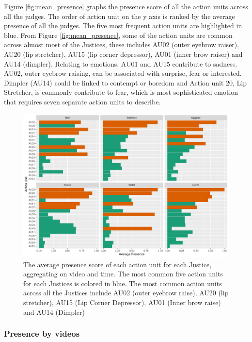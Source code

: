 \documentclass{monashthesis}
\begin{document}
\noindent Figure \ref{fig:mean_presence} graphs the presence score of all the action units across all the judges. The order of action unit on the y axis is ranked by the average presence of all the judges. The five most frequent action units are highlighted in blue. From Figure \ref{fig:mean_presence}, some of the action units are common across almost most of the Justices, these includes AU02 (outer eyebrow raiser), AU20 (lip stretcher), AU15 (lip corner depressor), AU01 (inner brow raiser) and AU14 (dimpler). Relating to emotions, AU01 and AU15 contribute to sadness. AU02, outer eyebrow raising, can be associated with surprise, fear or interested. Dimpler (AU14) could be linked to contempt or boredom and Action unit 20, Lip Stretcher, is commonly contribute to fear, which is most sophisticated emotion that requires seven separate action units to describe.

\begin{figure}

{\centering \includegraphics[width=1\linewidth]{figures/most-common-1} 

}

\caption{The average presence score of each action unit for each Justice, aggregating on video and time. The most common five action units for each Justices is colored in blue. The most common action units across all the Justices include AU02 (outer eyebrow raise), AU20 (lip stretcher), AU15 (Lip Corner Depressor), AU01 (Inner brow raise) and AU14 (Dimpler) \label{fig:mean_presence}}\label{fig:most-common}
\end{figure}

\hypertarget{presence-by-videos}{%
\subsubsection{Presence by videos}\label{presence-by-videos}}
\end{document}
